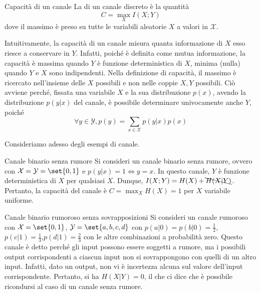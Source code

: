 \begin{definition}{Capacità di un canale}
  La  di un canale discreto è la quantità
  \[C = \max_{X} I(X;Y)\]
  dove il massimo è preso su tutte le variabili aleatorie \(X\) a valori in \(\mathcal{X}\).
\end{definition}
Intuitivamente, la capacità di un canale misura quanta informazione di $X$ esso riesce a conservare in $Y$. Infatti, poiché è definita come mutua informazione, la capacità è massima quando $Y$ è funzione deterministica di $X$, minima (nulla) quando $Y$ e $X$ sono indipendenti.
Nella definizione di capacità, il massimo è ricercato nell'insieme delle $X$ possibili e non nelle coppie $X,Y$ possibili. Ciò avviene perché, fissata una variabile \(X\) e la sua distribuzione $p(x)$, avendo la distribuzione \(p(y|x)\) del canale, è possibile determinare univocamente anche \(Y\), poiché
\[\forall y \in \mathcal{Y}, p(y) = \sum_{x\in\mathcal{X}} p(y|x)p(x)\]

Consideriamo adesso degli esempi di canale.
\begin{example}{Canale binario senza rumore}
  Si consideri un canale binario senza rumore, ovvero con \(\mathcal{X} = \mathcal{Y} = \set{0,1}\) e \(p(y|x) = 1 \iff y=x\).
  In questo canale, $Y$ è funzione deterministica di $X$ per qualsiasi $X$. Dunque, \(I(X;Y) = H(X) + \bcancel{H(X|Y)}\). Pertanto, la capacità del canale è \(C = \max_{X} H(X)=1\) per $X$ variabile uniforme.
\end{example}

\begin{example}{Canale binario rumoroso senza sovrapposizioni}
  Si consideri un canale rumoroso con \(\mathcal{X} = \set{0,1}\), \(\mathcal{Y} = \set{a,b,c,d}\) con \(p(a|0) = p(b|0) = \frac{1}{2}\), \(p(c|1) = \frac{1}{3}\),\(p(d|1) = \frac{2}{3}\) con le altre combinazioni a probabilità zero.
  Questo canale è detto  perché gli input possono essere soggetti a rumore, ma i possibili output corrispondenti a ciascun input non si sovrappongono con quelli di un altro input. Infatti, dato un output, non vi è incertezza alcuna sul valore dell'input corrispondente. Pertanto, si ha $H(X|Y)=0$, il che ci dice che è possibile ricondursi al caso di un canale senza rumore.
\end{example}


